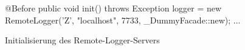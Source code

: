 \begin{wrapfigure}[6]{l}[0cm]{0.56\textwidth}
    \centering
    \vspace{-12px}
	\begin{spacing}{0.75}
		\begin{javacode}[firstnumber=19]
@Before
public void init() throws Exception
{
  logger = new RemoteLogger('Z', "localhost", 
                        7733, _DummyFacade::new);
  ...
}\end{javacode}
	\end{spacing}
	\caption{Initialisierung des Remote-Logger-Servers}
\end{wrapfigure}